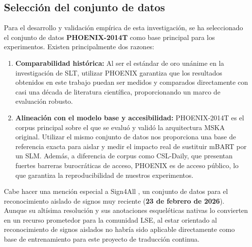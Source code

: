 \begin{itemize}
\end{itemize}

\subsection{Selección del conjunto de datos}
Para el desarrollo y validación empírica de esta investigación, se ha seleccionado el conjunto de datos \textbf{PHOENIX-2014T} como base principal para los experimentos.
Existen principalmente dos razones:
\begin{enumerate}
    \item \textbf{Comparabilidad histórica:} Al ser el estándar de oro unánime en la investigación de SLT, utilizar PHOENIX garantiza que los resultados obtenidos en este trabajo puedan ser medidos y comparados directamente con casi una década de literatura científica, proporcionando un marco de evaluación robusto.
    \item \textbf{Alineación con el modelo base y accesibilidad:} PHOENIX-2014T es el corpus principal sobre el que se evaluó y validó la arquitectura MSKA original.
    Utilizar el mismo conjunto de datos nos proporciona una base de referencia exacta para aislar y medir el impacto real de sustituir mBART por un SLM.
    Además, a diferencia de corpus como CSL-Daily, que presentan fuertes barreras burocráticas de acceso, PHOENIX es de acceso público, lo que garantiza la reproducibilidad de nuestros experimentos.
\end{enumerate}

Cabe hacer una mención especial a Sign4All \cite{sign4all}, un conjunto de datos para el reconocimiento aislado de signos muy reciente (\textbf{23 de febrero de 2026}).
Aunque su altísima resolución y sus anotaciones esqueléticas nativas lo convierten en un recurso prometedor para la comunidad LSE, al estar orientado al reconocimiento de signos aislados no habría sido aplicable directamente como base de entrenamiento para este proyecto de traducción continua.

